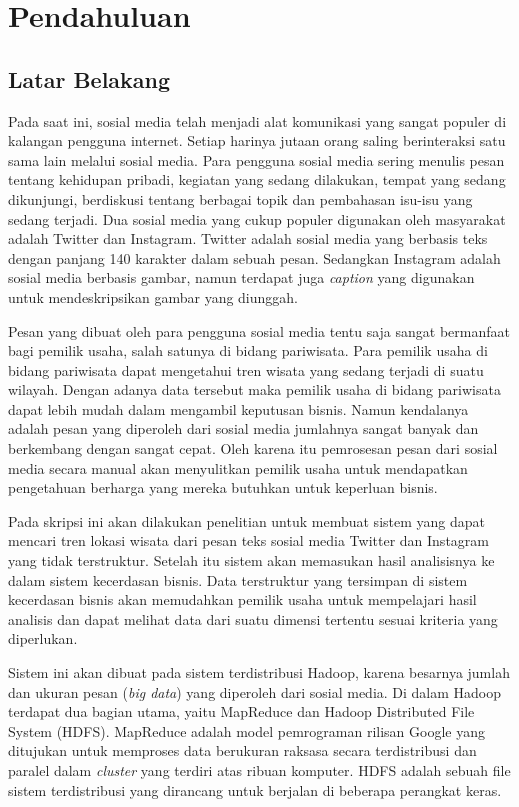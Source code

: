 \chapter{Pendahuluan}
\label{chap:pendahuluan}

\section{Latar Belakang}
\label{sec:latar_belakang}
Pada saat ini, sosial media telah menjadi alat komunikasi yang sangat populer di kalangan pengguna internet. Setiap harinya jutaan orang saling berinteraksi satu sama lain melalui sosial media. Para pengguna sosial media sering menulis pesan tentang kehidupan pribadi, kegiatan yang sedang dilakukan, tempat yang sedang dikunjungi, berdiskusi tentang berbagai topik dan pembahasan isu-isu yang sedang terjadi. Dua sosial media yang cukup populer digunakan oleh masyarakat adalah Twitter dan Instagram. Twitter adalah sosial media yang berbasis teks dengan panjang 140 karakter dalam sebuah pesan. Sedangkan Instagram adalah sosial media berbasis gambar, namun terdapat juga \textit{caption} yang digunakan untuk mendeskripsikan gambar yang diunggah.

Pesan yang dibuat oleh para pengguna sosial media tentu saja sangat bermanfaat bagi pemilik usaha, salah satunya di bidang pariwisata. Para pemilik usaha di bidang pariwisata dapat mengetahui tren wisata yang sedang terjadi di suatu wilayah. Dengan adanya data tersebut maka pemilik usaha di bidang pariwisata dapat lebih mudah dalam mengambil keputusan bisnis. Namun kendalanya adalah pesan yang diperoleh dari sosial media jumlahnya sangat banyak dan berkembang dengan sangat cepat. Oleh karena itu pemrosesan pesan dari sosial media secara manual akan menyulitkan pemilik usaha untuk mendapatkan pengetahuan berharga yang mereka butuhkan untuk keperluan bisnis.

Pada skripsi ini akan dilakukan penelitian untuk membuat sistem yang dapat mencari tren lokasi wisata dari pesan teks sosial media Twitter dan Instagram yang tidak terstruktur. Setelah itu sistem akan memasukan hasil analisisnya ke dalam sistem kecerdasan bisnis. Data terstruktur yang tersimpan di sistem kecerdasan bisnis akan memudahkan pemilik usaha untuk mempelajari hasil analisis dan dapat melihat data dari suatu dimensi tertentu sesuai kriteria yang diperlukan. 

Sistem ini akan dibuat pada sistem terdistribusi Hadoop, karena besarnya jumlah dan ukuran pesan (\textit{big data}) yang diperoleh dari sosial media. Di dalam Hadoop terdapat dua bagian utama, yaitu MapReduce dan Hadoop Distributed File System (HDFS). MapReduce adalah model pemrograman rilisan Google yang ditujukan untuk memproses data berukuran raksasa secara terdistribusi dan paralel dalam \textit{cluster} yang terdiri atas ribuan komputer. HDFS adalah sebuah file sistem terdistribusi yang dirancang untuk berjalan di beberapa perangkat keras.

